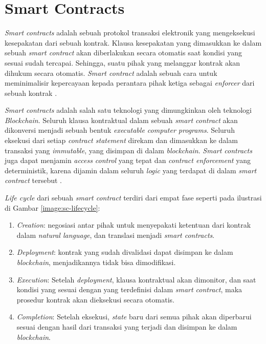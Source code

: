 \section{Smart Contracts}
\label{sec:smart-contract}

\textit{Smart contracts} adalah sebuah protokol transaksi elektronik yang mengeksekusi kesepakatan dari sebuah kontrak. Klausa kesepakatan yang dimasukkan ke dalam sebuah \textit{smart contract} akan diberlakukan secara otomatis saat kondisi yang sesuai sudah tercapai. Sehingga, suatu pihak yang melanggar kontrak akan dihukum secara otomatis. \textit{Smart contract} adalah sebuah cara untuk meminimalisir kepercayaan kepada perantara pihak ketiga sebagai \textit{enforcer} dari sebuah kontrak \parencite{szabo1997formalizing}.

\textit{Smart contracts} adalah salah satu teknologi yang dimungkinkan oleh teknologi \textit{Blockchain}. Seluruh klausa kontraktual dalam sebuah \textit{smart contract} akan dikonversi menjadi sebuah bentuk \textit{executable computer programs}. Seluruh eksekusi dari setiap \textit{contract statement} direkam dan dimasukkan ke dalam transaksi yang \textit{immutable}, yang disimpan di dalam \textit{blockchain}. \textit{Smart contracts} juga dapat menjamin \textit{access control} yang tepat dan \textit{contract enforcement} yang deterministik, karena dijamin dalam seluruh \textit{logic} yang terdapat di dalam \textit{smart contract} tersebut \parencite{zheng2020overview}.

\textit{Life cycle} dari sebuah \textit{smart contract} terdiri dari empat fase seperti pada ilustrasi di Gambar \ref{image:sc-lifecycle}:

\begin{enumerate}
	\item \textit{Creation}: negosiasi antar pihak untuk menyepakati ketentuan dari kontrak dalam \textit{natural language}, dan translasi menjadi \textit{smart contracts}.
	\item \textit{Deployment}: kontrak yang sudah divalidasi dapat disimpan ke dalam \textit{blockchain}, menjadikannya tidak bisa dimodifikasi.
	\item \textit{Execution}: Setelah \textit{deployment}, klausa kontraktual akan dimonitor, dan saat kondisi yang sesuai dengan yang terdefinisi dalam \textit{smart contract}, maka prosedur kontrak akan dieksekusi secara otomatis.
	\item \textit{Completion}: Setelah eksekusi, \textit{state} baru dari semua pihak akan diperbarui sesuai dengan hasil dari transaksi yang terjadi dan disimpan ke dalam \textit{blockchain}. 
\end{enumerate}

